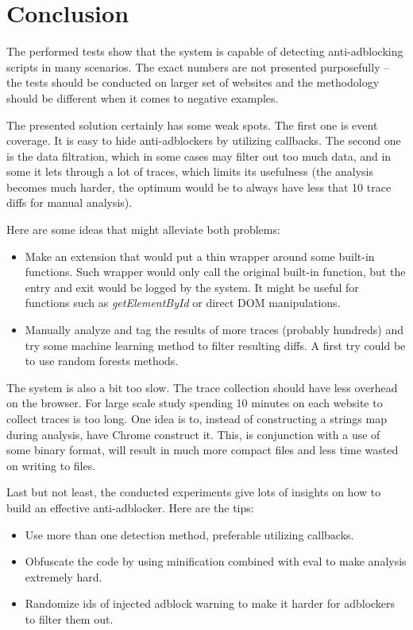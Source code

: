 \section{Conclusion}

The performed tests show that the system is capable of detecting anti-adblocking scripts in many scenarios.
The exact numbers are not presented purposefully -- the tests should be conducted on larger set of websites
and the methodology should be different when it comes to negative examples.

The presented solution certainly has some weak spots. The first one is event coverage. It is easy to hide anti-adblockers
by utilizing callbacks. The second one is the data filtration, which in some cases may filter out too much data,
and in some it lets through a lot of traces, which limits its usefulness (the analysis becomes much harder,
the optimum would be to always have less that 10 trace diffs for manual analysis).

Here are some ideas that might alleviate both problems:
\begin{itemize}
  \item Make an extension that would put a thin wrapper around some built-in functions. Such wrapper would only
           call the original built-in function, but the entry and exit would be logged by the system.
           It might be useful for functions such as \emph{getElementById} or direct DOM manipulations.
  \item Manually analyze and tag the results of more traces (probably hundreds) and try some machine learning method to filter
           resulting diffs. A first try could be to use random forests methods.
\end{itemize}

The system is also a bit too slow. The trace collection should have less overhead on the browser. For large scale study
spending 10 minutes on each website to collect traces is too long.
One idea is to, instead of constructing a strings map during analysis, have
Chrome construct it. This, is conjunction with a use of some binary format, will
result in much more compact files and less time wasted on writing to files.

Last but not least, the conducted experiments give lots of insights on how to build an effective anti-adblocker.
Here are the tips:
\begin{itemize}
  \item Use more than one detection method, preferable utilizing callbacks.
  \item Obfuscate the code by using minification combined with eval to make analysis extremely hard.
  \item Randomize ids of injected adblock warning to make it harder for adblockers to filter them out.
\end{itemize}
